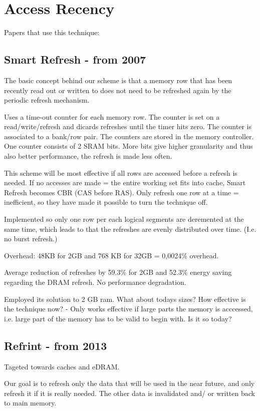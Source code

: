 \section{Access Recency}
\label{sec:acc}

Papers that use this technique:

\subsection{Smart Refresh\cite{smartrefresh} - from 2007}
The basic concept behind our scheme is that a memory row that has been recently read out or written to does not need to be refreshed again by the periodic refresh mechanism.

Uses a time-out counter for each memory row. The counter is set on a read/write/refresh and dicards refreshes until the timer hits zero. The counter is associated to a bank/row pair. The counters are stored in the memory controller. One counter consists of 2 SRAM bits. More bits give higher granularity and thus also better performance, the refresh is made less often.

This scheme will be most effective if all rows are accessed before a refresh is needed. If no accesses are made = the entire working set fits into cache, Smart Refresh becomes CBR (CAS before RAS). Only refresh one row at a time = inefficient, so they have made it possible to turn the technique off.

Implemented so only one row per each logical segments are deremented at the same time, which leads to that the refreshes are evenly distributed over time. (I.e. no burst refresh.)

Overhead: 48KB for 2GB and 768 KB for 32GB = 0,0024\% overhead. 

Average reduction of refreshes by 59.3\% for 2GB and 52.3\% energy saving regarding the DRAM refresh. No performance degradation.

Employed its solution to 2 GB ram. What about todays sizes? How effective is the technique now? - Only works effective if large parts the memory is acccessed, i.e. large part of the memory has to be valid to begin with. Is it so today?

\subsection{Refrint\cite{refrint} - from 2013}
Tageted towards caches and eDRAM.

Our goal is to refresh only the data that will be used in the near future, and only refresh it if it is really needed. The other data is invalidated and/ or written back to main memory.

